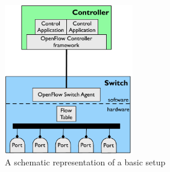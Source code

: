 \begin{figure}
  \begin{center}
\includegraphics[width=0.5\textwidth]{Background/BackgroundFigs/openflow-schema}
\caption{A schematic representation of a basic \of setup}
\label{fig:background:openflow-schema}
\end{center}
\end{figure}
